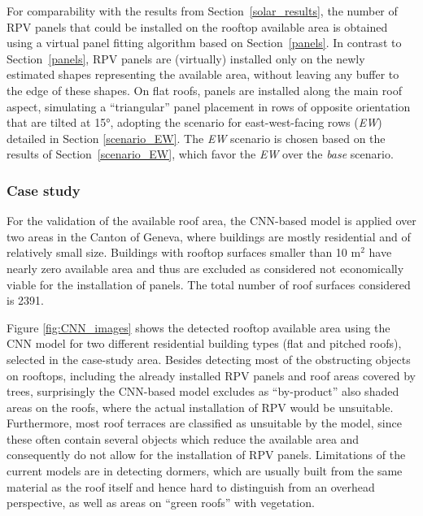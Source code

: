 For comparability with the results from Section~\ref{solar_results}, the number of RPV panels that could be installed on the rooftop available area is obtained using a virtual panel fitting algorithm based on Section~\ref{panels}. In contrast to Section~\ref{panels}, RPV panels are (virtually) installed only on the newly estimated shapes representing the available area, without leaving any buffer to the edge of these shapes. On flat roofs, panels are installed along the main roof aspect, simulating a “triangular” panel placement in rows of opposite orientation that are tilted at 15°, adopting the scenario for east-west-facing rows (\textit{EW}) detailed in Section \ref{scenario_EW}. The \textit{EW} scenario is chosen based on the results of Section~\ref{scenario_EW}, which favor the \textit{EW} over the \textit{base} scenario.

\subsubsection{Case study}

For the validation of the available roof area, 
the CNN-based model is applied over two areas in the Canton of Geneva, where buildings are mostly residential and of relatively small size.
Buildings with rooftop surfaces smaller than 10 m$^2$ have nearly zero available area and thus are excluded as considered not economically viable for the installation of panels. The total number of roof surfaces considered is 2391.

Figure \ref{fig:CNN_images} shows the detected rooftop available area using the CNN model for two different residential building types (flat and pitched roofs), selected in the case-study area. Besides detecting most of the obstructing objects on rooftops, including the already installed RPV panels and roof areas covered by trees, surprisingly the CNN-based model excludes as “by-product” also shaded areas on the roofs, where the actual installation of RPV would be unsuitable. Furthermore, most roof terraces are classified as unsuitable by the model, since these often contain several objects which reduce the available area and consequently do not allow for the installation of RPV panels. Limitations of the current models are in detecting dormers, which are usually built from the same material as the roof itself and hence hard to distinguish from an overhead perspective, as well as areas on “green roofs” with vegetation.

